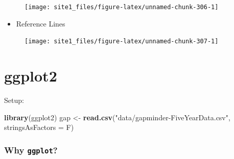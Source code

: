 \documentclass[]{book}
\newenvironment{Shaded}{\begin{snugshade}}{\end{snugshade}}
\newcommand{\KeywordTok}[1]{\textcolor[rgb]{0.13,0.29,0.53}{\textbf{#1}}}
\newcommand{\DataTypeTok}[1]{\textcolor[rgb]{0.13,0.29,0.53}{#1}}
\newcommand{\DecValTok}[1]{\textcolor[rgb]{0.00,0.00,0.81}{#1}}
\newcommand{\StringTok}[1]{\textcolor[rgb]{0.31,0.60,0.02}{#1}}
\newcommand{\CommentTok}[1]{\textcolor[rgb]{0.56,0.35,0.01}{\textit{#1}}}
\newcommand{\OperatorTok}[1]{\textcolor[rgb]{0.81,0.36,0.00}{\textbf{#1}}}
\newcommand{\NormalTok}[1]{#1}
\providecommand{\tightlist}{%
  \setlength{\itemsep}{0pt}\setlength{\parskip}{0pt}}
\begin{document}
\begin{figure}

{\centering \texttt{[image: site1\_files/figure-latex/unnamed-chunk-306-1]} 

}

\caption{ }\label{fig:unnamed-chunk-306}
\end{figure}

\begin{itemize}
\tightlist
\item
  Reference Lines
\end{itemize}

\begin{Shaded}
\end{Shaded}

\begin{figure}

{\centering \texttt{[image: site1\_files/figure-latex/unnamed-chunk-307-1]} 

}

\caption{ }\label{fig:unnamed-chunk-307}
\end{figure}

\section{ggplot2}\label{ggplot2}

Setup:

\begin{Shaded}
\begin{Highlighting}[]
\KeywordTok{library}\NormalTok{(ggplot2)}
\NormalTok{gap <-}\StringTok{ }\KeywordTok{read.csv}\NormalTok{(}\StringTok{"data/gapminder-FiveYearData.csv"}\NormalTok{, }\DataTypeTok{stringsAsFactors =}\NormalTok{ F)}
\end{Highlighting}
\end{Shaded}

\subsubsection*{\texorpdfstring{Why
\texttt{ggplot}?}{Why ggplot?}}\label{why-ggplot}
\end{document}
